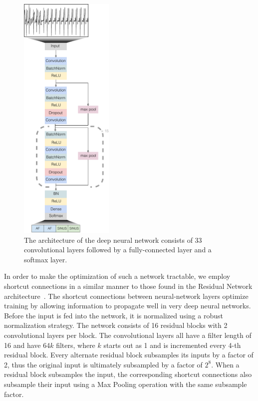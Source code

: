 \begin{figure}
\centering
\includegraphics[width=0.4\textwidth]{arrhythmias/figures/ecg_network_full.pdf}
\caption{The architecture of the deep neural network consists of 33
         convolutional layers followed by a fully-connected layer and
         a softmax layer.}
\label{fig:arrhythmias:net}
\end{figure}

In order to make the optimization of such a network tractable, we employ
shortcut connections in a similar manner to those found in the Residual Network
architecture~\cite{he2016identity}. The shortcut connections between
neural-network layers optimize training by allowing information to propagate
well in very deep neural networks. Before the input is fed into the network, it
is normalized using a robust normalization strategy. The network consists of 16
residual blocks with 2 convolutional layers per block. The convolutional layers
all have a filter length of 16 and have 64$k$ filters, where $k$ starts out as
1 and is incremented every 4-th residual block. Every alternate residual block
subsamples its inputs by a factor of 2, thus the original input is ultimately
subsampled by a factor of $2^8$. When a residual block subsamples the input,
the corresponding shortcut connections also subsample their input using a Max
Pooling operation with the same subsample factor. 

